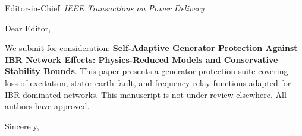 \documentclass[11pt,a4paper]{letter}
\begin{document}
\begin{letter}{Editor-in-Chief\ \textit{IEEE Transactions on Power Delivery}}
\opening{Dear Editor,}
We submit for consideration: \textbf{Self-Adaptive Generator Protection Against IBR Network Effects: Physics-Reduced Models and Conservative Stability Bounds}.
This paper presents a generator protection suite covering loss-of-excitation, stator earth fault, and frequency relay functions adapted for IBR-dominated networks.
This manuscript is not under review elsewhere. All authors have approved.
\closing{Sincerely,}
\end{letter}
\end{document}
